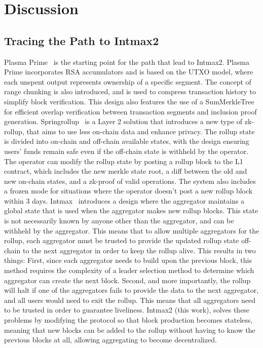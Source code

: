 \section{Discussion}

\subsection{Tracing the Path to Intmax2}

Plasma Prime~\cite{plasma_prime} is the starting point for the path that lead to Intmax2. Plasma Prime incorporates RSA accumulators and is based on the UTXO model, where each unspent output represents ownership of a specific segment. The concept of range chunking is also introduced, and is used to compress transaction history to simplify block verification. This design also features the use of a SumMerkleTree for efficient overlap verification between transaction segments and inclusion proof generation.
\smallbreak
Springrollup~\cite{springrollup} is a Layer 2 solution that introduces a new type of zk-rollup, that aims to use less on-chain data and enhance privacy. The rollup state is divided into on-chain and off-chain available states, with the design ensuring users' funds remain safe even if the off-chain state is withheld by the operator. The operator can modify the rollup state by posting a rollup block to the L1 contract, which includes the new merkle state root, a diff between the old and new on-chain states, and a zk-proof of valid operations. The system also includes a frozen mode for situations where the operator doesn't post a new rollup block within 3 days.
\smallbreak
Intmax~\cite{intmax} introduces a design where the aggregator maintains a global state that is used when the aggregator makes new rollup blocks. This state is not necessarily known by anyone other than the aggregator, and can be withheld by the aggregator. This means that to allow multiple aggregators for the rollup, each aggregator must be trusted to provide the updated rollup state off-chain to the next aggregator in order to keep the rollup alive. This results in two things: First, since each aggregator needs to build upon the previous block, this method requires the complexity of a leader selection method to determine which aggregator can create the next block. Second, and more importantly, the rollup will halt if one of the aggregators fails to provide the data to the next aggregator, and all users would need to exit the rollup. This means that all aggregators need to be trusted in order to guarantee liveliness.
\smallbreak
Intmax2 (this work), solves these problems by modifying the protocol so that block production becomes stateless,
meaning that new blocks can be added to the rollup without having to know the previous blocks at all, allowing aggregating to become decentralized.

